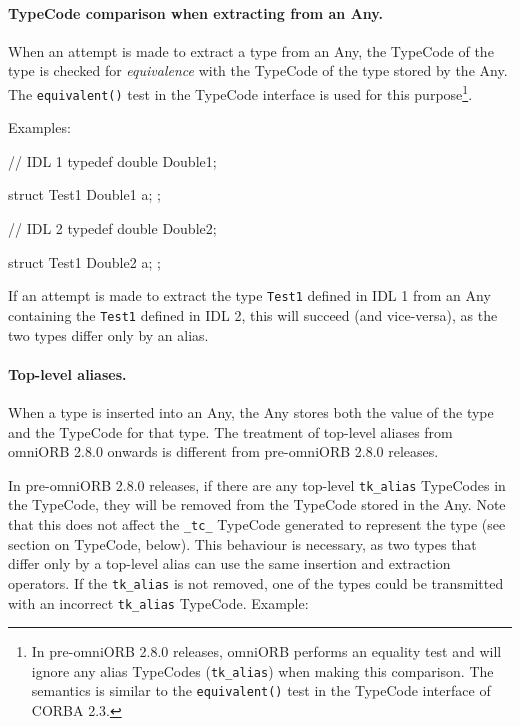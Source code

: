 \documentclass[11pt,twoside,a4paper]{book}
\newcommand{\type}[1]{\texttt{#1}}
\newcommand{\code}[1]{\texttt{#1}}
\newcommand{\op}[1]{\texttt{#1()}}
\begin{document}
\paragraph*{TypeCode comparison when extracting from an Any.}
When an attempt is made to extract a type from an Any, the TypeCode of
the type is checked for \emph{equivalence} with the TypeCode of the
type stored by the Any. The \op{equivalent} test in the TypeCode
interface is used for this purpose\footnote{In pre-omniORB 2.8.0
releases, omniORB performs an equality test and will ignore any alias
TypeCodes (\code{tk\_alias}) when making this comparison. The
semantics is similar to the \op{equivalent} test in the TypeCode
interface of CORBA 2.3.}.

Examples:

\begin{idllisting}
// IDL 1
typedef double Double1;

struct Test1 {
  Double1 a;
};
\end{idllisting}

\begin{idllisting}
// IDL 2
typedef double Double2;

struct Test1 {
  Double2 a;
};
\end{idllisting}
    
If an attempt is made to extract the type \type{Test1} defined in IDL
1 from an Any containing the \type{Test1} defined in IDL 2, this will
succeed (and vice-versa), as the two types differ only by an alias.

\paragraph*{Top-level aliases.}
When a type is inserted into an Any, the Any stores both the value of
the type and the TypeCode for that type. The treatment of top-level
aliases from omniORB 2.8.0 onwards is different from pre-omniORB 2.8.0
releases.

In pre-omniORB 2.8.0 releases, if there are any top-level
\code{tk\_alias} TypeCodes in the TypeCode, they will be removed from
the TypeCode stored in the Any. Note that this does not affect the
\code{\_tc\_} TypeCode generated to represent the type (see section on
TypeCode, below). This behaviour is necessary, as two types that
differ only by a top-level alias can use the same insertion and
extraction operators. If the \code{tk\_alias} is not removed, one of
the types could be transmitted with an incorrect \code{tk\_alias}
TypeCode. Example:
\end{document}
